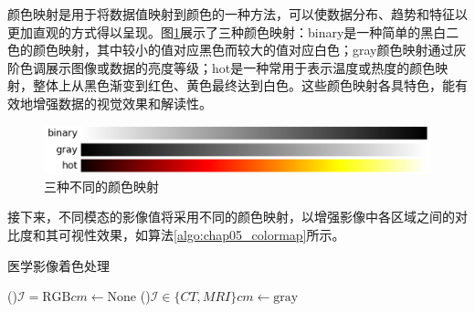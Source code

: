 颜色映射是用于将数据值映射到颜色的一种方法，可以使数据分布、趋势和特征以更加直观的方式得以呈现。图\ref{fig:chap05_colormap}展示了三种颜色映射：binary是一种简单的黑白二色的颜色映射，其中较小的值对应黑色而较大的值对应白色；gray颜色映射通过灰阶色调展示图像或数据的亮度等级；hot是一种常用于表示温度或热度的颜色映射，整体上从黑色渐变到红色、黄色最终达到白色。这些颜色映射各具特色，能有效地增强数据的视觉效果和解读性。

\begin{figure}[htbp]
  \centering
  \includegraphics[width=\textwidth]{figures/chap05_colormap.jpg}
  \caption{三种不同的颜色映射}
  \label{fig:chap05_colormap}
\end{figure}

接下来，不同模态的影像值将采用不同的颜色映射，以增强影像中各区域之间的对比度和其可视性效果，如算法\ref{algo:chap05_colormap}所示。

\begin{algorithm}
  \caption{医学影像着色处理}
  \label{algo:chap05_colormap}
  \vspace{5pt}

  \lIf(){$\mathcal{I} = \text{RGB}$}{$cm \leftarrow \text{None}$}
  \lElseIf(){$\mathcal{I} \in \{CT,MRI\}$}{$cm \leftarrow \text{gray}$}
\end{algorithm}

